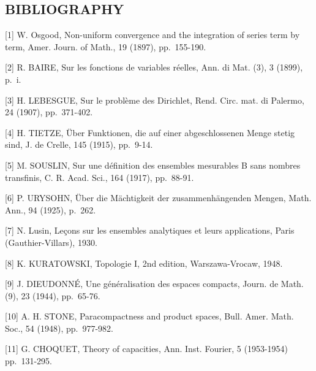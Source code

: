 \subsection*{BIBLIOGRAPHY}

{[}1{]} W. Osgood, Non-uniform convergence and the integration of series term by term, Amer. Journ. of Math., 19 (1897), pp.~155-190.

{[}2{]} R. BAIRE, Sur les fonctions de variables réelles, Ann. di Mat. (3), 3 (1899), p.~i.

{[}3{]} H. LEBESGUE, Sur le problème des Dirichlet, Rend. Circ. mat. di Palermo, 24 (1907), pp.~371-402.

{[}4{]} H. TIETZE, Über Funktionen, die auf einer abgeschlossenen Menge stetig sind, J. de Crelle, 145 (1915), pp.~9-14.

{[}5{]} M. SOUSLIN, Sur une définition des ensembles mesurables B sans nombres transfinis, C. R. Acad. Sci., 164 (1917), pp.~88-91.

{[}6{]} P. URYSOHN, Über die Mächtigkeit der zusammenhängenden Mengen, Math. Ann., 94 (1925), p.~262.

{[}7{]} N. Lusin, Leçons sur les ensembles analytiques et leurs applications, Paris (Gauthier-Villars), 1930.

{[}8{]} K. KURATOWSKI, Topologie I, 2nd edition, Warszawa-Vrocaw, 1948.

{[}9{]} J. DIEUDONNÉ, Une généralisation des espaces compacts, Journ. de Math. (9), 23 (1944), pp.~65-76.

{[}10{]} A. H. STONE, Paracompactness and product spaces, Bull. Amer. Math. Soc., 54 (1948), pp.~977-982.

{[}11{]} G. CHOQUET, Theory of capacities, Ann. Inst. Fourier, 5 (1953-1954) pp.~131-295.

\ResumeMainChapters
